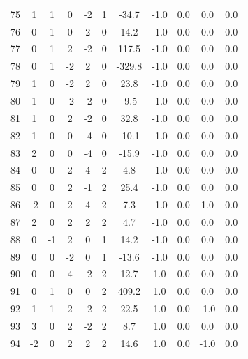\documentclass [12pt, a4paper] {article}
\begin{document}
\begin {center}
\begin {longtable}{| c | c c c c c | c | c | c | c | r |}
      75 & 1&   1&   0&  -2&   1&     -34.7&      -1.0&       0.0&       0.0&       0.0 \\
      76 & 0&   1&   0&   2&   0&      14.2&      -1.0&       0.0&       0.0&       0.0 \\
      77 & 0&   1&   2&  -2&   0&     117.5&      -1.0&       0.0&       0.0&       0.0 \\
      78 & 0&   1&  -2&   2&   0&    -329.8&      -1.0&       0.0&       0.0&       0.0 \\
      79 & 1&   0&  -2&   2&   0&      23.8&      -1.0&       0.0&       0.0&       0.0 \\
      80 & 1&   0&  -2&  -2&   0&      -9.5&      -1.0&       0.0&       0.0&       0.0 \\
      81 & 1&   0&   2&  -2&   0&      32.8&      -1.0&       0.0&       0.0&       0.0 \\
      82 & 1&   0&   0&  -4&   0&     -10.1&      -1.0&       0.0&       0.0&       0.0 \\
      83 & 2&   0&   0&  -4&   0&     -15.9&      -1.0&       0.0&       0.0&       0.0 \\
      84 & 0&   0&   2&   4&   2&       4.8&      -1.0&       0.0&       0.0&       0.0 \\
      85 & 0&   0&   2&  -1&   2&      25.4&      -1.0&       0.0&       0.0&       0.0 \\
      86 & -2&   0&   2&   4&   2&       7.3&      -1.0&       0.0&       1.0&       0.0 \\
      87 & 2&   0&   2&   2&   2&       4.7&      -1.0&       0.0&       0.0&       0.0 \\
      88 & 0&  -1&   2&   0&   1&      14.2&      -1.0&       0.0&       0.0&       0.0 \\
      89 & 0&   0&  -2&   0&   1&     -13.6&      -1.0&       0.0&       0.0&       0.0 \\
      90 & 0&   0&   4&  -2&   2&      12.7&       1.0&       0.0&       0.0&       0.0 \\
      91 & 0&   1&   0&   0&   2&     409.2&       1.0&       0.0&       0.0&       0.0 \\
      92 & 1&   1&   2&  -2&   2&      22.5&       1.0&       0.0&      -1.0&       0.0 \\
      93 & 3&   0&   2&  -2&   2&       8.7&       1.0&       0.0&       0.0&       0.0 \\
      94 & -2&   0&   2&   2&   2&      14.6&       1.0&       0.0&      -1.0&       0.0 \\

\end{longtable}
\end{center}
\end{document}
